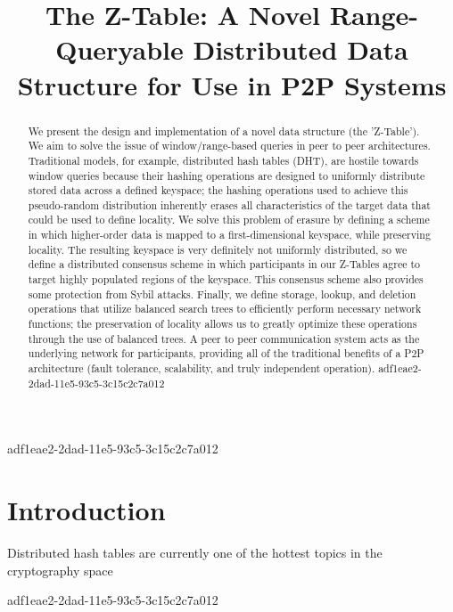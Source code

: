 \documentclass[12pt]{article}
\title{The Z-Table: A Novel Range-Queryable Distributed Data Structure for Use in P2P Systems}
\begin{document}
\maketitle

adf1eae2-2dad-11e5-93c5-3c15c2c7a012\begin{abstract}
We present the design and implementation of a novel data structure (the 'Z-Table'). We aim to solve the issue of window/range-based queries in peer to peer architectures. Traditional models, for example,  distributed hash tables (DHT), are hostile towards window queries because their hashing operations are designed to uniformly distribute stored data across a defined keyspace; the hashing operations used to achieve this pseudo-random distribution inherently erases all characteristics of the target data that could be used to define locality. We solve this problem of erasure by defining a scheme in which higher-order data is mapped to a first-dimensional keyspace, while preserving locality. The resulting keyspace is very definitely not uniformly distributed, so we define a distributed consensus scheme in which participants in our Z-Tables agree to target highly populated regions of the keyspace. This consensus scheme also provides some protection from Sybil attacks. Finally, we define storage, lookup, and deletion operations that utilize balanced search trees to efficiently perform necessary network functions; the preservation of locality allows us to greatly optimize these operations through the use of balanced trees. A peer to peer communication system acts as the underlying network for participants, providing all of the traditional benefits of a P2P architecture (fault tolerance, scalability, and truly independent operation).
adf1eae2-2dad-11e5-93c5-3c15c2c7a012\end{abstract}


\newpage
\section{Introduction}
Distributed hash tables are currently one of the hottest topics in the cryptography space~\cite{Stoica:2001dj,Rowstron:2001ea,Ratnasamy:2001wn}

adf1eae2-2dad-11e5-93c5-3c15c2c7a012\printbibliography
\end{document}
